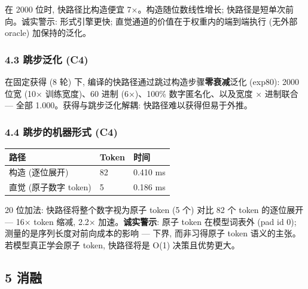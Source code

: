 \documentclass[
]{article}
\begin{document}
在 2000 位时, 快路径比构造便宜 7×。构造随位数线性增长;
快路径是短单次前向。诚实警示: 形式引擎更快;
直觉通道的价值在于权重内的端到端执行 (无外部 oracle) 加保持的泛化。

\subsubsection{4.3 跳步泛化 (C4)}\label{ux8df3ux6b65ux6cdbux5316-c4}

在固定获得 (8 轮) 下, 编译的快路径通过跳过构造步骤\textbf{零衰减}泛化
(exp80): 2000 位宽 (10× 训练宽度)、60 进制 (6×)、100\%
数字匿名化、以及宽度 × 进制联合 --- 全部 1.000。获得与跳步泛化解耦:
快路径难以获得但易于外推。

\subsubsection{4.4 跳步的机器形式
(C4)}\label{ux8df3ux6b65ux7684ux673aux5668ux5f62ux5f0f-c4}

\begin{longtable}[]{@{}lll@{}}
\toprule\noalign{}
路径 & Token & 时间 \\
\midrule\noalign{}
\endhead
\bottomrule\noalign{}
\endlastfoot
构造 (逐位展开) & 82 & 0.410 ms \\
直觉 (原子数字 token) & 5 & 0.186 ms \\
\end{longtable}

20 位加法: 快路径将整个数字视为原子 token (5 个) 对比 82 个 token
的逐位展开 --- 16× token 缩减, 2.2× 加速。\textbf{诚实警示}: 原子 token
在模型词表外 (pad id 0); 测量的是序列长度对前向成本的影响 --- 下界,
而非习得原子 token 语义的主张。若模型真正学会原子 token, 快路径将是 O(1)
决策且优势更大。

\subsection{5 消融}\label{ux6d88ux878d}
\end{document}
